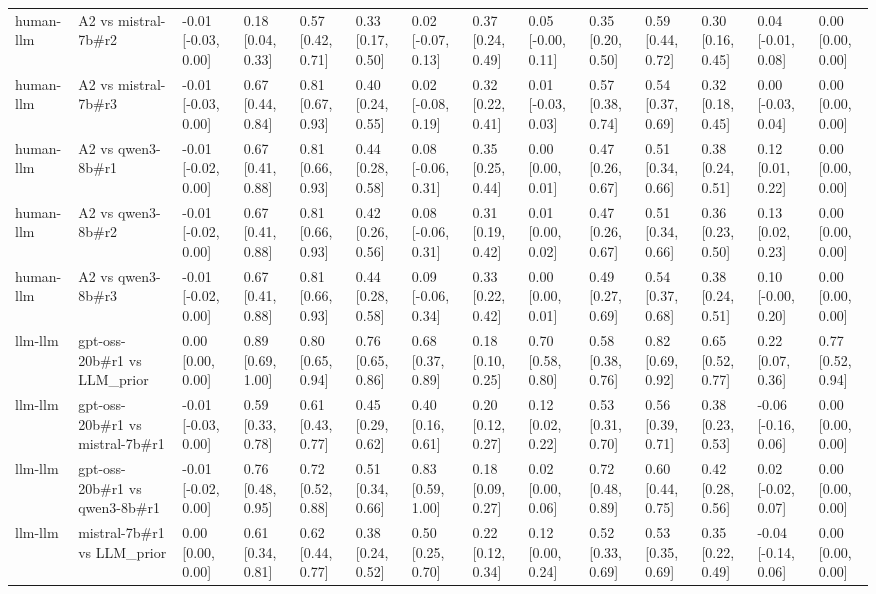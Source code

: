 \begin{table}
{\begin{tabular}{llllllllllllll}
human-llm & A2 vs mistral-7b\#r2 & -0.01 [-0.03, 0.00] & 0.18 [0.04, 0.33] & 0.57 [0.42, 0.71] & 0.33 [0.17, 0.50] & 0.02 [-0.07, 0.13] & 0.37 [0.24, 0.49] & 0.05 [-0.00, 0.11] & 0.35 [0.20, 0.50] & 0.59 [0.44, 0.72] & 0.30 [0.16, 0.45] & 0.04 [-0.01, 0.08] & 0.00 [0.00, 0.00] \\
human-llm & A2 vs mistral-7b\#r3 & -0.01 [-0.03, 0.00] & 0.67 [0.44, 0.84] & 0.81 [0.67, 0.93] & 0.40 [0.24, 0.55] & 0.02 [-0.08, 0.19] & 0.32 [0.22, 0.41] & 0.01 [-0.03, 0.03] & 0.57 [0.38, 0.74] & 0.54 [0.37, 0.69] & 0.32 [0.18, 0.45] & 0.00 [-0.03, 0.04] & 0.00 [0.00, 0.00] \\
human-llm & A2 vs qwen3-8b\#r1 & -0.01 [-0.02, 0.00] & 0.67 [0.41, 0.88] & 0.81 [0.66, 0.93] & 0.44 [0.28, 0.58] & 0.08 [-0.06, 0.31] & 0.35 [0.25, 0.44] & 0.00 [0.00, 0.01] & 0.47 [0.26, 0.67] & 0.51 [0.34, 0.66] & 0.38 [0.24, 0.51] & 0.12 [0.01, 0.22] & 0.00 [0.00, 0.00] \\
human-llm & A2 vs qwen3-8b\#r2 & -0.01 [-0.02, 0.00] & 0.67 [0.41, 0.88] & 0.81 [0.66, 0.93] & 0.42 [0.26, 0.56] & 0.08 [-0.06, 0.31] & 0.31 [0.19, 0.42] & 0.01 [0.00, 0.02] & 0.47 [0.26, 0.67] & 0.51 [0.34, 0.66] & 0.36 [0.23, 0.50] & 0.13 [0.02, 0.23] & 0.00 [0.00, 0.00] \\
human-llm & A2 vs qwen3-8b\#r3 & -0.01 [-0.02, 0.00] & 0.67 [0.41, 0.88] & 0.81 [0.66, 0.93] & 0.44 [0.28, 0.58] & 0.09 [-0.06, 0.34] & 0.33 [0.22, 0.42] & 0.00 [0.00, 0.01] & 0.49 [0.27, 0.69] & 0.54 [0.37, 0.68] & 0.38 [0.24, 0.51] & 0.10 [-0.00, 0.20] & 0.00 [0.00, 0.00] \\
llm-llm & gpt-oss-20b\#r1 vs LLM\_prior & 0.00 [0.00, 0.00] & 0.89 [0.69, 1.00] & 0.80 [0.65, 0.94] & 0.76 [0.65, 0.86] & 0.68 [0.37, 0.89] & 0.18 [0.10, 0.25] & 0.70 [0.58, 0.80] & 0.58 [0.38, 0.76] & 0.82 [0.69, 0.92] & 0.65 [0.52, 0.77] & 0.22 [0.07, 0.36] & 0.77 [0.52, 0.94] \\
llm-llm & gpt-oss-20b\#r1 vs mistral-7b\#r1 & -0.01 [-0.03, 0.00] & 0.59 [0.33, 0.78] & 0.61 [0.43, 0.77] & 0.45 [0.29, 0.62] & 0.40 [0.16, 0.61] & 0.20 [0.12, 0.27] & 0.12 [0.02, 0.22] & 0.53 [0.31, 0.70] & 0.56 [0.39, 0.71] & 0.38 [0.23, 0.53] & -0.06 [-0.16, 0.06] & 0.00 [0.00, 0.00] \\
llm-llm & gpt-oss-20b\#r1 vs qwen3-8b\#r1 & -0.01 [-0.02, 0.00] & 0.76 [0.48, 0.95] & 0.72 [0.52, 0.88] & 0.51 [0.34, 0.66] & 0.83 [0.59, 1.00] & 0.18 [0.09, 0.27] & 0.02 [0.00, 0.06] & 0.72 [0.48, 0.89] & 0.60 [0.44, 0.75] & 0.42 [0.28, 0.56] & 0.02 [-0.02, 0.07] & 0.00 [0.00, 0.00] \\
llm-llm & mistral-7b\#r1 vs LLM\_prior & 0.00 [0.00, 0.00] & 0.61 [0.34, 0.81] & 0.62 [0.44, 0.77] & 0.38 [0.24, 0.52] & 0.50 [0.25, 0.70] & 0.22 [0.12, 0.34] & 0.12 [0.00, 0.24] & 0.52 [0.33, 0.69] & 0.53 [0.35, 0.69] & 0.35 [0.22, 0.49] & -0.04 [-0.14, 0.06] & 0.00 [0.00, 0.00] \\

\end{tabular}}
\end{table}
